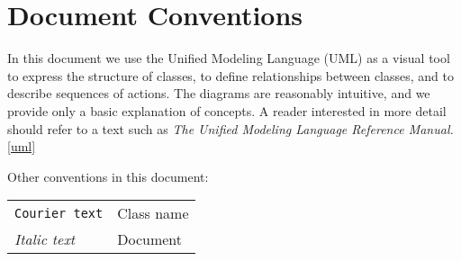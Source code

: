 \section{Document Conventions}
\label{sec:conventions}

In this document we use the Unified Modeling Language (UML) as a visual tool 
to express the structure of 
classes, to define relationships between classes, and to describe sequences
of actions.  The diagrams are reasonably intuitive, and we provide 
only a basic explanation of concepts.  A reader interested in more detail should 
refer to a text such as {\it The Unified Modeling Language Reference Manual.} \ref{uml}

Other conventions in this document: 
\begin{tabular}{ll}
{\tt Courier text} & {Class name} \\
{\it Italic text} & {Document} 
\end{tabular}









